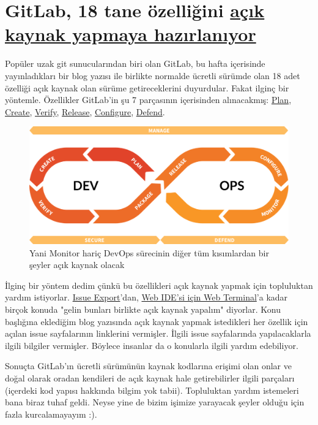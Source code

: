 \documentclass[11pt]{article}
\begin{document}
\section{GitLab, 18 tane özelliğini \href{https://about.gitlab.com/blog/2020/03/30/new-features-to-core/}{açık kaynak yapmaya hazırlanıyor}}
\label{sec:org28e1f2a}
Popüler uzak git sunucularından biri olan GitLab, bu hafta içerisinde
yayınladıkları bir blog yazısı ile birlikte normalde ücretli sürümde olan 18
adet özelliği açık kaynak olan sürüme getireceklerini duyurdular. Fakat ilginç
bir yöntemle. Özellikler GitLab'in şu 7 parçasının içerisinden alınacakmış:
\href{https://about.gitlab.com/features/\#plan}{Plan}, \href{https://about.gitlab.com/features/\#create}{Create}, \href{https://about.gitlab.com/features/\#verify}{Verify}, \href{https://about.gitlab.com/features/\#release}{Release}, \href{https://about.gitlab.com/features/\#configure}{Configure}, \href{https://about.gitlab.com/features/\#defend}{Defend}.

\begin{figure}[htbp]
\centering
\includegraphics[width=.9\linewidth]{gorseller/gitlab-devops-plan.png}
\caption{Yani Monitor hariç DevOps sürecinin diğer tüm kısımlardan bir şeyler açık kaynak olacak}
\end{figure}

İlginç bir yöntem dedim çünkü bu özellikleri açık kaynak yapmak için
topluluktan yardım istiyorlar. \href{https://gitlab.com/gitlab-org/gitlab/-/issues/212330}{Issue Export}'dan, \href{https://gitlab.com/gitlab-org/gitlab/-/issues/211685}{Web IDE'si için Web
Terminal}'a kadar birçok konuda "gelin bunları birlikte açık kaynak yapalım"
diyorlar. Konu başlığına eklediğim blog yazısında açık kaynak yapmak
istedikleri her özellik için açılan issue sayfalarının linklerini vermişler.
İlgili issue sayfalarında yapılacaklarla ilgili bilgiler vermişler. Böylece
insanlar da o konularla ilgili yardım edebiliyor.

Sonuçta GitLab'ın ücretli sürümünün kaynak kodlarına erişimi olan onlar ve
doğal olarak oradan kendileri de açık kaynak hale getirebilirler ilgili
parçaları (içerdeki kod yapısı hakkında bilgim yok tabii). Topluluktan yardım
istemeleri bana biraz tuhaf geldi. Neyse yine de bizim işimize yarayacak
şeyler olduğu için fazla kurcalamayayım :).
\end{document}
